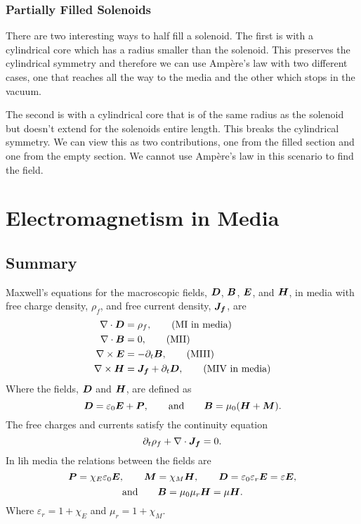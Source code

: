     \subsubsection{Partially Filled Solenoids}
    There are two interesting ways to half fill a solenoid.
    The first is with a cylindrical core which has a radius smaller than the solenoid.
    This preserves the cylindrical symmetry and therefore we can use Amp\`ere's law with two different cases, one that reaches all the way to the media and the other which stops in the vacuum.
    
    The second is with a cylindrical core that is of the same radius as the solenoid but doesn't extend for the solenoids entire length.
    This breaks the cylindrical symmetry.
    We can view this as two contributions, one from the filled section and one from the empty section.
    We cannot use Amp\`ere's law in this scenario to find the field.
    
    \section{Electromagnetism in Media}
    \subsection{Summary}
    Maxwell's equations for the macroscopic fields, \(\bm{D}\), \(\bm{B}\), \(\bm{E}\), and \(\bm{H}\), in media with free charge density, \(\rho_f\), and free current density, \(\bm{J_f}\), are
    \begin{align*}
        \nabla\cdot\bm{D} &= \rho_f, \tag{MI in media}\\ 
        \nabla\cdot\bm{B} &= 0, \tag{MII}\\
        \nabla\times\bm{E} &= -\partial_t\bm{B},\tag{MIII}\\
        \nabla\times\bm{H} &= \bm{J_f} + \partial_t\bm{D},\tag{MIV in media}
    \end{align*}
    Where the fields, \(\bm{D}\) and \(\bm{H}\), are defined as
    \[\bm{D} = \varepsilon_0\bm{E} + \bm{P},\qquad\text{and}\qquad \bm{B} = \mu_0(\bm{H} + \bm{M}).\]
    The free charges and currents satisfy the continuity equation
    \[\partial_t\rho_f + \nabla\cdot\bm{J_f} = 0.\]
    In \gls{lih} media the relations between the fields are
    \[\bm{P} = \chi_E\varepsilon_0\bm{E}, \qquad \bm{M} = \chi_M\bm{H}, \qquad \bm{D} = \varepsilon_0\varepsilon_r\bm{E} = \varepsilon\bm{E},\]
    \[\text{and}\qquad \bm{B} = \mu_0\mu_r\bm{H} = \mu\bm{H}.\]
    Where \(\varepsilon_r = 1 + \chi_E\) and \(\mu_r = 1 + \chi_M\).
    
